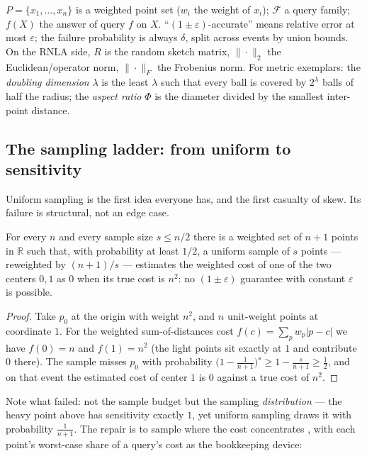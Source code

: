 \begin{remarkbox}[Notation]
$P = \{x_1,\dots,x_n\}$ is a weighted point set ($w_i$ the weight of
$x_i$); $\mathcal{F}$ a query family; $f(X)$ the answer of query $f$ on
$X$. ``$(1\pm\varepsilon)$-accurate'' means relative error at most
$\varepsilon$; the failure probability is always $\delta$, split across
events by union bounds. On the RNLA side, $R$ is the random sketch
matrix, $\|{\cdot}\|_2$ the Euclidean/operator norm, $\|{\cdot}\|_F$ the
Frobenius norm. For metric exemplars: the \emph{doubling dimension}
$\lambda$ is the least $\lambda$ such that every ball is covered by
$2^\lambda$ balls of half the radius; the \emph{aspect ratio} $\Phi$ is
the diameter divided by the smallest inter-point distance.
\end{remarkbox}

\subsection{The sampling ladder: from uniform to sensitivity}
\label{sec:cor-sampling-ladder}

Uniform sampling is the first idea everyone has, and the first casualty
of skew. Its failure is structural, not an edge case.

\begin{proposition}\label{prop:cor-uniform}
For every $n$ and every sample size $s \le n/2$ there is a weighted set
of $n+1$ points in $\mathbb{R}$ such that, with probability at least
$1/2$, a uniform sample of $s$ points --- reweighted by $(n+1)/s$ ---
estimates the weighted cost of one of the two centers $0,1$ as $0$ when
its true cost is $n^2$: no $(1\pm\varepsilon)$ guarantee with constant
$\varepsilon$ is possible. \eop
\end{proposition}

\begin{proof}
Take $p_0$ at the origin with weight $n^2$, and $n$ unit-weight points
at coordinate $1$. For the weighted sum-of-distances cost $f(c) =
\sum_p w_p |p - c|$ we have $f(0) = n$ and $f(1) = n^2$ (the light
points sit exactly at $1$ and contribute $0$ there). The sample misses
$p_0$ with probability $\bigl(1 - \tfrac{1}{n+1}\bigr)^{s} \ge 1 -
\tfrac{s}{n+1} \ge \tfrac12$, and on that event the estimated cost of
center $1$ is $0$ against a true cost of $n^2$.
\end{proof}

Note what failed: not the sample budget but the sampling
\emph{distribution} --- the heavy point above has sensitivity exactly
$1$, yet uniform sampling draws it with probability $\tfrac{1}{n+1}$. The
repair is to sample where the cost concentrates
\citep{coresets-rnla-bg10,coresets-rnla-bg11}, with each point's
worst-case share of a query's cost as the bookkeeping device:

